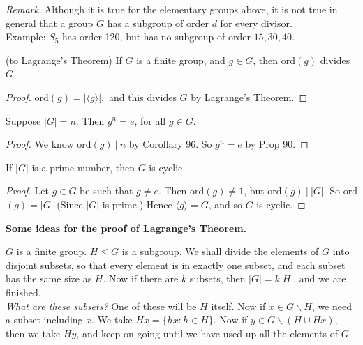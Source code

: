 \documentclass[10pt]{scrartcl}
\begin{document}
\noindent \textit{Remark.} Although it is true for the elementary groups above, it is not true in general that a group $G$ has a subgroup of order $d$ for every divisor.\\
 Example: $S_5$ has order 120, but has no subgroup of order $15,30,40$.\\
 
 
\begin{corollary} (to Lagrange's Theorem) If $G$ is a finite group, and $g \in G$, then ord$(g)$ divides $G$.	
\end{corollary}


\begin{proof}
ord$(g) = |\langle g \rangle|,$ and this divides $G$ by Lagrange's Theorem.	
\end{proof}\vspace*{5pt}

\begin{corollary}Suppose $|G| = n$. Then $g^n = e$, for all $g \in G.$	
\end{corollary}

\begin{proof}
We know ord$(g) ~|~ n$ by Corollary 96. So $g^n = e$ by Prop 90.
\end{proof}\vspace*{5pt}

\begin{corollary} If $|G|$ is a prime number, then $G$ is cyclic.	
\end{corollary}

\begin{proof}
Let $g \in G$ be such that $g \neq e$. Then ord$(g)\neq 1$, but ord$(g) ~|~ |G|$. So ord$(g) = |G|$ (Since $|G|$ is prime.)	Hence $\langle g \rangle = G$, and so $G$ is cyclic.
\end{proof}\vspace*{5pt}


\textbf{Some ideas for the proof of Lagrange's Theorem.}

$G$ is a finite group. $H \leq G$ is a subgroup. We shall divide the elements of $G$ into disjoint subsets, so that every element is in exactly one subset, and each subset has the same size as $H$. Now if there are $k$ subsets, then $|G| = k|H|$, and we are finished.\\

\textit{What are these subsets?} One of these will be $H$ itself. Now if $x \in G\backslash H$, we need a subset including $x$. We take $Hx = \{hx : h \in H\}$. Now if $y \in G \backslash(H \cup Hx)$, then we take $Hy$, and keep on going until we have used up all the elements of $G$.\\
\end{document}
